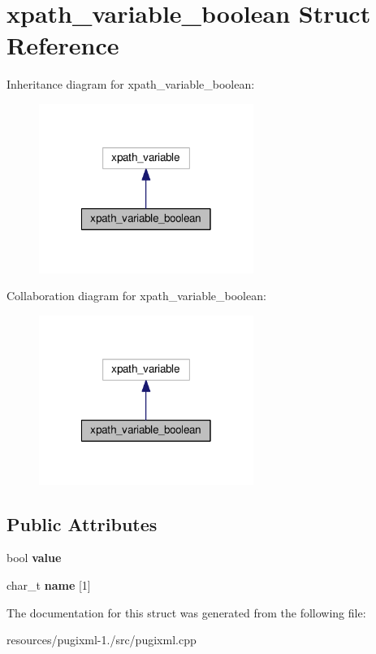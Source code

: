 \hypertarget{structxpath__variable__boolean}{\section{xpath\+\_\+variable\+\_\+boolean Struct Reference}
\label{structxpath__variable__boolean}
}


Inheritance diagram for xpath\+\_\+variable\+\_\+boolean\+:
\nopagebreak
\begin{figure}[H]
\begin{center}
\leavevmode
\includegraphics[width=198pt]{structxpath__variable__boolean__inherit__graph}
\end{center}
\end{figure}


Collaboration diagram for xpath\+\_\+variable\+\_\+boolean\+:
\nopagebreak
\begin{figure}[H]
\begin{center}
\leavevmode
\includegraphics[width=198pt]{structxpath__variable__boolean__coll__graph}
\end{center}
\end{figure}
\subsection*{Public Attributes}
\begin{DoxyCompactItemize}
\item 
\hypertarget{structxpath__variable__boolean_ab54117a6cced8c3e029724651df4d404}{bool {\bfseries value}}\label{structxpath__variable__boolean_ab54117a6cced8c3e029724651df4d404}

\item 
\hypertarget{structxpath__variable__boolean_a2b2cb81ee5c9a19a667428d08d5bb951}{char\+\_\+t {\bfseries name} \mbox{[}1\mbox{]}}\label{structxpath__variable__boolean_a2b2cb81ee5c9a19a667428d08d5bb951}

\end{DoxyCompactItemize}


The documentation for this struct was generated from the following file\+:\begin{DoxyCompactItemize}
\item 
resources/pugixml-\/1./src/pugixml.\+cpp\end{DoxyCompactItemize}
